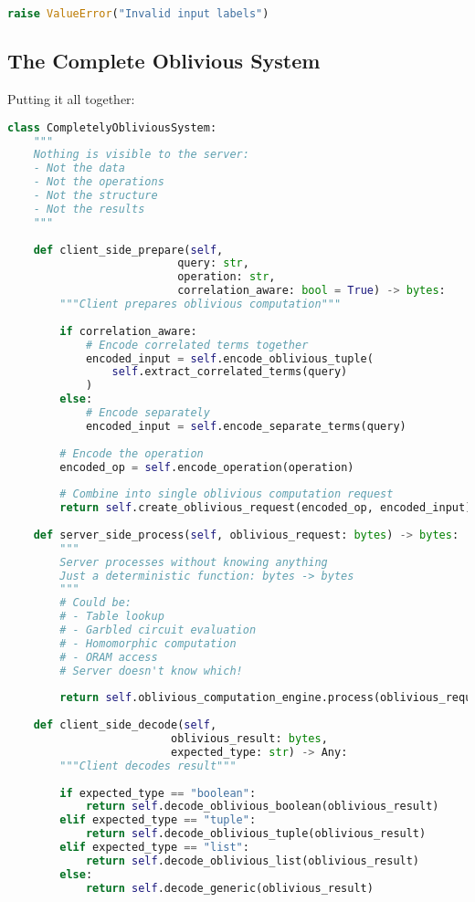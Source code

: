 \begin{lstlisting}[language=Python, caption={Garbled circuit approach}]
        raise ValueError("Invalid input labels")
\end{lstlisting}

\subsection{The Complete Oblivious System}

Putting it all together:

\begin{lstlisting}[language=Python, caption={Complete oblivious system}]
class CompletelyObliviousSystem:
    """
    Nothing is visible to the server:
    - Not the data
    - Not the operations
    - Not the structure
    - Not the results
    """
    
    def client_side_prepare(self, 
                          query: str,
                          operation: str,
                          correlation_aware: bool = True) -> bytes:
        """Client prepares oblivious computation"""
        
        if correlation_aware:
            # Encode correlated terms together
            encoded_input = self.encode_oblivious_tuple(
                self.extract_correlated_terms(query)
            )
        else:
            # Encode separately
            encoded_input = self.encode_separate_terms(query)
        
        # Encode the operation
        encoded_op = self.encode_operation(operation)
        
        # Combine into single oblivious computation request
        return self.create_oblivious_request(encoded_op, encoded_input)
    
    def server_side_process(self, oblivious_request: bytes) -> bytes:
        """
        Server processes without knowing anything
        Just a deterministic function: bytes -> bytes
        """
        # Could be:
        # - Table lookup
        # - Garbled circuit evaluation  
        # - Homomorphic computation
        # - ORAM access
        # Server doesn't know which!
        
        return self.oblivious_computation_engine.process(oblivious_request)
    
    def client_side_decode(self, 
                         oblivious_result: bytes,
                         expected_type: str) -> Any:
        """Client decodes result"""
        
        if expected_type == "boolean":
            return self.decode_oblivious_boolean(oblivious_result)
        elif expected_type == "tuple":
            return self.decode_oblivious_tuple(oblivious_result)
        elif expected_type == "list":
            return self.decode_oblivious_list(oblivious_result)
        else:
            return self.decode_generic(oblivious_result)
\end{lstlisting}

